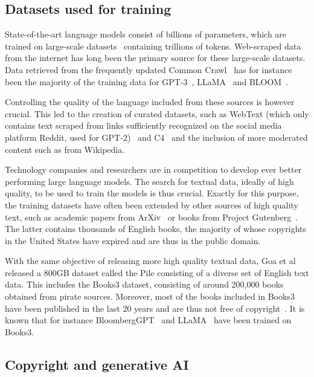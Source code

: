 \documentclass[twocolumn,10pt]{article}
\begin{document}
\subsection{Datasets used for training}

State-of-the-art language models consist of billions of parameters, which are trained on large-scale datasets~\cite{bender2021dangers,kaplan2020scaling} containing trillions of tokens. Web-scraped data from the internet has long been the primary source for these large-scale datasets. Data retrieved from the frequently updated Common Crawl~\cite{commoncrawl} has for instance been the majority of the training data for GPT-3~\cite{brown2020language}, LLaMA~\cite{touvron2023llama} and BLOOM~\cite{scao2022bloom}. 

Controlling the quality of the language included from these sources is however crucial. This led to the creation of curated datasets, such as WebText (which only contains text scraped from links sufficiently recognized on the social media platform Reddit, used for GPT-2)~\cite{radford2019language} and C4~\cite{raffel2020exploring} and the inclusion of more moderated content such as from Wikipedia. 

Technology companies and researchers are in competition to develop ever better performing large language models. The search for textual data, ideally of high quality, to be used to train the models is thus crucial. Exactly for this purpose, the training datasets have often been extended by other sources of high quality text, such as academic papers from ArXiv~\cite{lewkowycz2022solving} or books from Project Gutenberg~\cite{projectgutenberg}. The latter contains thousands of English books, the majority of whose copyrights in the United States have expired and are thus in the public domain. 

With the same objective of releasing more high quality textual data, Goa et al~\cite{song2019auditing} released a 800GB dataset called the Pile consisting of a diverse set of English text data. This includes the Books3 dataset, consisting of around 200,000 books obtained from pirate sources. Moreover, most of the books included in Books3 have been published in the last 20 years and are thus not free of copyright~\cite{atlantic,wired}. It is known that for instance BloombergGPT~\cite{wu2023bloomberggpt} and LLaMA~\cite{touvron2023llama} have been trained on Books3. 

\subsection{Copyright and generative AI}
\end{document}
